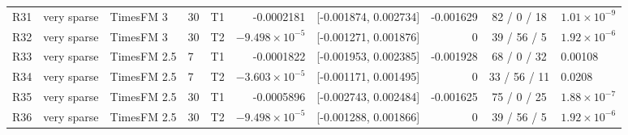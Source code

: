 \begin{table}[htbp]
\begin{tabular}{llllcrcrcl}
R31 & very sparse & TimesFM 3 & 30 & T1 & -0.0002181 & [-0.001874, 0.002734] & -0.001629 & 82 / 0 / 18 & $1.01 \times 10^{-9}$ \\
R32 & very sparse & TimesFM 3 & 30 & T2 & $-9.498 \times 10^{-5}$ & [-0.001271, 0.001876] & 0 & 39 / 56 / 5 & $1.92 \times 10^{-6}$ \\
R33 & very sparse & TimesFM 2.5 & 7 & T1 & -0.0001822 & [-0.001953, 0.002385] & -0.001928 & 68 / 0 / 32 & 0.00108 \\
R34 & very sparse & TimesFM 2.5 & 7 & T2 & $-3.603 \times 10^{-5}$ & [-0.001171, 0.001495] & 0 & 33 / 56 / 11 & 0.0208 \\
R35 & very sparse & TimesFM 2.5 & 30 & T1 & -0.0005896 & [-0.002743, 0.002484] & -0.001625 & 75 / 0 / 25 & $1.88 \times 10^{-7}$ \\
R36 & very sparse & TimesFM 2.5 & 30 & T2 & $-9.498 \times 10^{-5}$ & [-0.001288, 0.001866] & 0 & 39 / 56 / 5 & $1.92 \times 10^{-6}$ \\
\bottomrule
\end{tabular}
\end{table}


